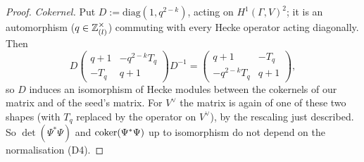 \begin{proof}
\emph{Cokernel.} Put $D:=\mathrm{diag}(1,q^{2-k})$, acting on $H^1(\Gamma,V)^2$; it is an automorphism ($q\in\mathbb{Z}_{(l)}^\times$) commuting with every Hecke operator
acting diagonally. Then
\[D\begin{pmatrix}q+1&-q^{2-k}T_q\\-T_q&q+1\end{pmatrix}D^{-1}=\begin{pmatrix}q+1&-T_q\\-q^{2-k}T_q&q+1\end{pmatrix},\]
so $D$ induces an isomorphism of Hecke modules between the cokernels of our matrix and of the seed's matrix. For $V^\vee$ the matrix is again of one of these two
shapes (with $T_q$ replaced by the operator on $V^\vee$), by the rescaling just described. So $\det(\Psi^*\Psi)$ and $\operatorname{coker}(\Psi^*\Psi)$ up to isomorphism do not
depend on the normalisation (D4).
\end{proof}

